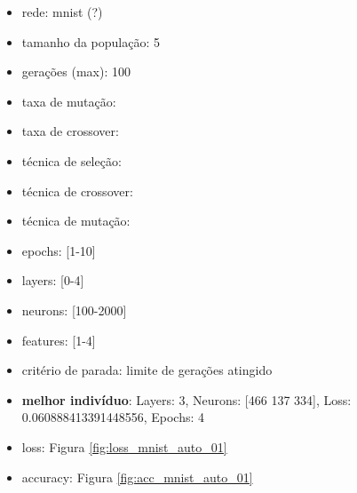 \documentclass[twoside,conference,a4paper]{IEEEtran}
\begin{document}
\begin{itemize}
    \item rede: mnist (?)
    \item tamanho da população: 5
    \item gerações (max): 100
    \item taxa de mutação:
    \item taxa de crossover:
    \item técnica de seleção:
    \item técnica de crossover:
    \item técnica de mutação:
    \item epochs: [1-10]
    \item layers: [0-4]
    \item neurons: [100-2000]
    \item features: [1-4]
    \item critério de parada: limite de gerações atingido
    \item \textbf{melhor indivíduo}: Layers: 3, Neurons: [466 137 334], Loss: 0.060888413391448556, Epochs: 4
    \item loss: Figura \ref{fig:loss_mnist_auto_01}
    \item accuracy: Figura \ref{fig:acc_mnist_auto_01}
\end{itemize}
\end{document}
